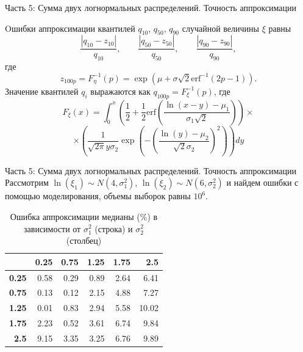 \documentclass[ucs, notheorems, handout]{beamer}
\begin{document}
\begin{frame}{Часть 5: Сумма двух логнормальных распределений. Точность аппроксимации }
	
	Oшибки аппроксимации квантилей $q_{10}$, $q_{50}$, $q_{90}$ случайной величины $\xi$ равны
\[\dfrac{\left| q_{10} - z_{10}\right|}{q_{10}}, \quad\quad \dfrac{\left| q_{50} - z_{50}\right|}{q_{50}}, \quad\quad \dfrac{\left| q_{90} - z_{90}\right|}{q_{90}},\] где
\[z_{100p} = F_{\eta}^{-1}(p) = \exp(\mu+\sigma\sqrt{2}\mathrm{erf}^{-1}(2p-1)).\]
Значение квантилей $q_{i}$ выражаются как $q_{100p} = F_{\xi}^{-1}(p)$, где
\[F_{\xi}(x) = \int_{0}^{x}\left( \dfrac{1}{2}+\dfrac{1}{2} \mathrm{erf}\left( \dfrac{\ln(x-y)-\mu_{1}}{\sigma_{1}\sqrt{2}}\right) \right)\times\]
\[\times \left( \dfrac{1}{\sqrt{2\pi}y\sigma_{2}}\exp\left( -\left( \dfrac{\ln(y)-\mu_{2}}{\sqrt{2}\sigma_{2}}\right) ^{2}\right) \right) dy \]
	
\end{frame}

\begin{frame}{Часть 5: Сумма двух логнормальных распределений. Точность аппроксимации }
	Рассмотрим $\ln(\xi_{1}) \sim N(4, \sigma _{1}^{2})$, $\ln(\xi_{2}) \sim N(6, \sigma _{2}^{2})$ и найдем ошибки с помощью моделирования, объемы выборок равны $10^{6}$.
	
	
	\begin{table}[ht]
		\centering
		\caption{Ошибка аппроксимации медианы ($\%$) в зависимости от $\sigma_{1}^{2}$ (строка) и $\sigma_{2}^{2}$ (столбец)}
		\begin{tabular}{rrrrrr}
			\hline
			& \textbf{0.25} & \textbf{0.75} & \textbf{1.25} & \textbf{1.75} & \textbf{2.5} \\ 
			\hline
			\textbf{0.25} & 0.58 & 0.29 & 0.89 & 2.64 & 6.41 \\ 
			\textbf{0.75} & 0.13 & 0.12 & 2.15 & 4.88 & 7.27 \\ 
			\textbf{1.25} & 0.01 & 0.83 & 2.94 & 5.58 & 10.02 \\ 
			\textbf{1.75} & 2.23 & 0.52 & 3.61 & 6.74 & 9.84 \\ 
			\textbf{2.5} & 9.15 & 3.35 & 3.25 & 6.76 & 9.89 \\ 
			\hline
		\end{tabular}
	\end{table}
	
\end{frame}
\end{document}
